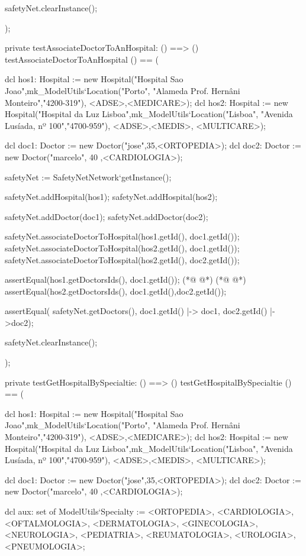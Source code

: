 \begin{vdmpp}[breaklines=true]
  safetyNet.clearInstance();
    
);


private testAssociateDoctorToAnHospital: () ==> ()
 testAssociateDoctorToAnHospital () == (
 
  dcl hos1: Hospital := new Hospital("Hospital Sao Joao",mk_ModelUtils`Location("Porto", "Alameda Prof. Hernâni Monteiro","4200-319"), {<ADSE>,<MEDICARE>});
  dcl hos2: Hospital := new Hospital("Hospital da Luz Lisboa",mk_ModelUtils`Location("Lisboa", "Avenida Lusíada, nº 100","4700-959"), {<ADSE>,<MEDIS>, <MULTICARE>}); 
  
  dcl doc1: Doctor := new Doctor("jose",35,<ORTOPEDIA>);
  dcl doc2: Doctor := new Doctor("marcelo", 40 ,<CARDIOLOGIA>);
  
  safetyNet := SafetyNetNetwork`getInstance();
   
  safetyNet.addHospital(hos1);
  safetyNet.addHospital(hos2);
  
  safetyNet.addDoctor(doc1);
  safetyNet.addDoctor(doc2);

  safetyNet.associateDoctorToHospital(hos1.getId(), doc1.getId());
  safetyNet.associateDoctorToHospital(hos2.getId(), doc1.getId());
  safetyNet.associateDoctorToHospital(hos2.getId(), doc2.getId());
  
  assertEqual(hos1.getDoctorsIds(), {doc1.getId()});
(*@
\label{testGetHospitalBySpecialtie:282}
@*)
(*@
\label{testDisassociateDoctorToAnHospital:282}
@*)
  assertEqual(hos2.getDoctorsIds(), {doc1.getId(),doc2.getId()});

  assertEqual( safetyNet.getDoctors(), {doc1.getId() |-> doc1, doc2.getId() |->doc2});
  
  safetyNet.clearInstance();
    
);

private testGetHospitalBySpecialtie: () ==> ()
 testGetHospitalBySpecialtie () == (
 
  dcl hos1: Hospital := new Hospital("Hospital Sao Joao",mk_ModelUtils`Location("Porto", "Alameda Prof. Hernâni Monteiro","4200-319"), {<ADSE>,<MEDICARE>});
  dcl hos2: Hospital := new Hospital("Hospital da Luz Lisboa",mk_ModelUtils`Location("Lisboa", "Avenida Lusíada, nº 100","4700-959"), {<ADSE>,<MEDIS>, <MULTICARE>}); 
  
  dcl doc1: Doctor := new Doctor("jose",35,<ORTOPEDIA>);
  dcl doc2: Doctor := new Doctor("marcelo", 40 ,<CARDIOLOGIA>);
  
  dcl aux: set of ModelUtils`Specialty := {<ORTOPEDIA>, <CARDIOLOGIA>, <OFTALMOLOGIA>, <DERMATOLOGIA>, <GINECOLOGIA>, <NEUROLOGIA>, <PEDIATRIA>, <REUMATOLOGIA>, <UROLOGIA>, <PNEUMOLOGIA>};
  

\end{vdmpp}

